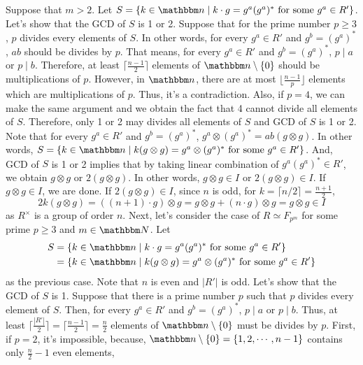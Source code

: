 Suppose that \(m > 2\).
Let \(S = \{k \in \bbn \mid k \cdot g = g^a (g^a)^* \text{ for some } g^a \in R'\}\).
Let's show that the GCD of \(S\) is 1 or 2.
Suppose that for the prime number \(p \ge 3\), \(p\) divides every elements of \(S\).
In other words, for every \(g^a \in R'\) and \(g^b = (g^a)^*\),
\(ab\) should be divides by \(p\).
That means, for every \(g^a \in R'\) and \(g^b = (g^a)^*\),
\(p \mid a\) or \(p \mid b\).
Therefore, at least \(\lceil \frac{n - 1}{2} \rceil\) elements of \(\bbn \setminus \{0\}\) should be multiplications of \(p\).
However, in \(\bbn\), there are at most \(\lfloor \frac{n - 1}{p} \rfloor\)
elements which are multiplications of \(p\).
Thus, it's a contradiction.
Also, if \(p = 4\), we can make the same argument and we obtain the fact that
4 cannot divide all elements of \(S\).
Therefore, only 1 or 2 may divides all elements of \(S\) and GCD of \(S\) is 1 or 2.
Note that for every \(g^a \in R'\) and \(g^b = (g^a)^*\),
\(g^a \otimes (g^a)^* = ab(g \otimes g)\).
In other words, \(S = \{k \in \bbn \mid k (g \otimes g) = g^a \otimes (g^a)^* \text{ for some } g^a \in R'\}\).
And, GCD of \(S\) is 1 or 2 implies that by taking linear combination of \(g^a (g^a)^* \in R'\), we obtain \(g \otimes g\) or \(2 (g \otimes g)\).
In other words, \(g \otimes g \in I\) or \(2 (g \otimes g) \in I\).
If \(g \otimes g \in I\), we are done.
If \(2 (g \otimes g) \in I\),
since \(n\) is odd, for \(k = \lceil n/2 \rceil = \frac{n + 1}{2}\),
\[2k(g \otimes g) = ((n + 1) \cdot g) \otimes g = g \otimes g + (n \cdot g) \otimes g = g \otimes g \in I\]
as \(R^\times\) is a group of order \(n\).
\br
\noindent
Next, let's consider the case of \(R \simeq F_{p^m}\) for some prime \(p \ge 3\) and \(m \in \bbN\).
Let
\begin{align*}
S &= \{k \in \bbn \mid k \cdot g = g^a (g^a)^* \text{ for some } g^a \in R'\}
\\&= \{k \in \bbn \mid k (g \otimes g) = g^a \otimes (g^a)^* \text{ for some } g^a \in R'\}
\end{align*}
as the previous case.
Note that \(n\) is even and \(|R'|\) is odd.
Let's show that the GCD of \(S\) is 1.
Suppose that there is a prime number \(p\) such that \(p\) divides every element of \(S\).
Then, for every \(g^a \in R'\) and \(g^b = (g^a)^*\),
\(p \mid a\) or \(p \mid b\).
Thus, at least \(\lceil\frac{|R'|}{2}\rceil = \lceil\frac{n - 1}{2}\rceil = \frac{n}{2}\)
elements of \(\bbn \setminus \{0\}\) must be divides by \(p\).
First, if \(p = 2\), it's impossible, because, \(\bbn \setminus \{0\} = \{1, 2, \cdots, n - 1\}\) contains only \(\frac{n}{2} - 1\) even elements,
